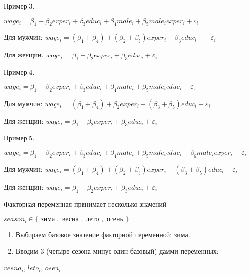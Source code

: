 \documentclass[ignorenonframetext,]{beamer}
\begin{document}
\begin{frame}{Пример 3.}

$wage_i = \beta_1 + \beta_2 exper_i + \beta_3 educ_i + \beta_4 male_i + \beta_5 male_i exper_i + \varepsilon_i$

Для мужчин:
$wage_i = (\beta_1+\beta_4) + (\beta_2+\beta_5) exper_i + \beta_3 educ_i + + \varepsilon_i$

Для женщин:
$wage_i = \beta_1 + \beta_2 exper_i + \beta_3 educ_i + \varepsilon_i$

\end{frame}

\begin{frame}{Пример 4.}

$wage_i = \beta_1 + \beta_2 exper_i + \beta_3 educ_i + \beta_4 male_i + \beta_5 male_i educ_i + \varepsilon_i$

Для мужчин:
$wage_i = (\beta_1+\beta_4) + \beta_2 exper_i + (\beta_3 + \beta_5) educ_i + \varepsilon_i$

Для женщин:
$wage_i = \beta_1 + \beta_2 exper_i + \beta_3 educ_i + \varepsilon_i$

\end{frame}

\begin{frame}{Пример 5.}

$wage_i = \beta_1 + \beta_2 exper_i + \beta_3 educ_i + \beta_4 male_i + \beta_5 male_i educ_i + \beta_6 male_i exper_i + \varepsilon_i$

Для мужчин:
$wage_i = (\beta_1+\beta_4) + (\beta_2 + \beta_6) exper_i + (\beta_3 + \beta_5) educ_i + \varepsilon_i$

Для женщин:
$wage_i = \beta_1 + \beta_2 exper_i + \beta_3 educ_i + \varepsilon_i$

\end{frame}

\begin{frame}{Факторная переменная принимает несколько значений}

$season_i \in \{\text{ зима }, \text{ весна }, \text{ лето }, \text{ осень }  \}$

\begin{enumerate}
\def\labelenumi{\arabic{enumi}.}
\item
  Выбираем базовое значение факторной переменной: зима.
\item
  Вводим 3 (четыре сезона минус один базовый) дамми-переменных:
\end{enumerate}

$vesna_i$, $leto_i$, $osen_i$

\end{frame}
\end{document}
